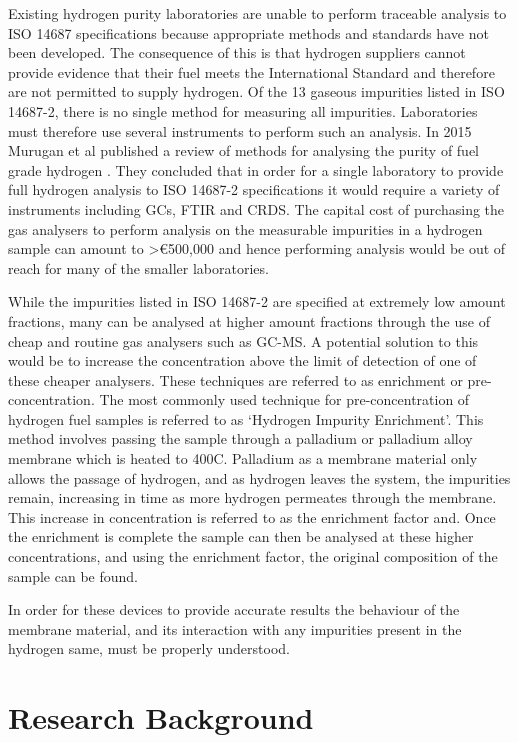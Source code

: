 Existing hydrogen purity laboratories are unable to perform traceable analysis to ISO 14687 
specifications because appropriate methods and standards have not been developed. The consequence 
of this is that hydrogen suppliers cannot provide evidence that their fuel meets the International 
Standard and therefore are not permitted to supply hydrogen. Of the 13 gaseous impurities listed in 
ISO 14687-2, there is no single method for measuring all impurities. Laboratories must therefore use 
several instruments to perform such an analysis.  In 2015 Murugan et al published a review of methods 
for analysing the purity of fuel grade hydrogen \cite{Murugan2015}. They concluded that in order for a single 
laboratory to provide full hydrogen analysis to ISO 14687-2 specifications it would require 
a variety of instruments including GCs, FTIR and CRDS. The capital cost of purchasing the gas 
analysers to perform analysis on the measurable impurities in a hydrogen sample can amount to 
>€500,000 \cite{Murugan2015} and hence performing analysis would be out of reach for many of the smaller 
laboratories. 

While the impurities listed in ISO 14687-2 are specified at extremely low amount fractions, 
many can be analysed at higher amount fractions through the use of cheap and routine gas 
analysers such as GC-MS. A potential solution to this would be to increase the concentration 
above the limit of detection of one of these cheaper analysers. These techniques are referred 
to as enrichment or pre-concentration. The most commonly used technique for pre-concentration 
of hydrogen fuel samples is referred to as ‘Hydrogen Impurity Enrichment’.  This method involves 
passing the sample through a palladium or palladium alloy membrane which is heated to 400\textdegree C. 
Palladium as a membrane material only allows the passage of hydrogen, and as hydrogen leaves the system, 
the impurities remain, increasing in time as more hydrogen permeates through the membrane.
This increase in concentration is referred to as the enrichment factor and. 
Once the enrichment is complete the sample can then be analysed at these higher concentrations, 
and using the enrichment factor, the original composition of the sample can be found. 

In order for these devices to provide accurate results the behaviour of the membrane material, and its interaction with any impurities present in the hydrogen same, must be properly understood.  


\section{Research Background}
